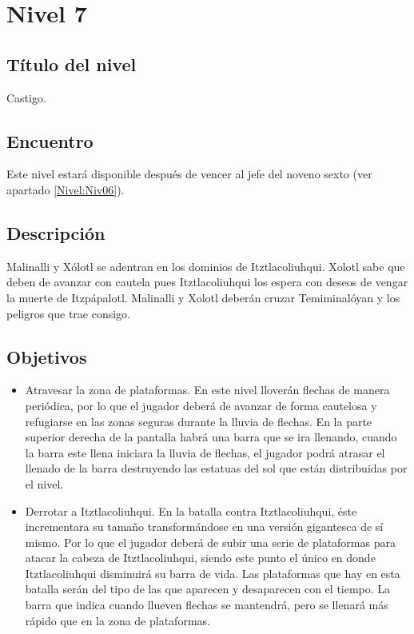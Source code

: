 \section{Nivel 7}  \label{Nivel:Niv07}
	\subsection{Título del nivel}
	Castigo.
	\subsection{Encuentro}
	Este nivel estará disponible después de vencer al jefe del noveno sexto (ver apartado \ref{Nivel:Niv06}).
	\subsection{Descripción}
	Malinalli y Xólotl se adentran en los dominios de Itztlacoliuhqui. Xolotl sabe que deben de avanzar con cautela pues Itztlacoliuhqui los espera con deseos de vengar la muerte de Itzpápalotl. Malinalli y Xolotl deberán cruzar Temiminalóyan y los peligros que trae consigo.
	\subsection{Objetivos}
	\begin{itemize}
		\item Atravesar la zona de plataformas. En este nivel lloverán flechas de manera periódica, por lo que el jugador deberá de avanzar de forma cautelosa y refugiarse en las zonas seguras durante la lluvia de flechas. En la parte superior derecha de la pantalla habrá una barra que se ira llenando, cuando la barra este llena iniciara la lluvia de flechas, el jugador podrá atrasar el llenado de la barra destruyendo las estatuas del sol que están distribuidas por el nivel.  
		\item Derrotar a Itztlacoliuhqui. En la batalla contra Itztlacoliuhqui, éste incrementara su tamaño transformándose en una versión gigantesca de sí mismo.  Por lo que el jugador deberá de subir una serie de plataformas para atacar la cabeza de Itztlacoliuhqui, siendo este punto el único en donde Itztlacoliuhqui disminuirá su barra de vida. Las plataformas que hay en esta batalla serán del tipo de las que aparecen y desaparecen con el tiempo. La barra que indica cuando llueven flechas se mantendrá, pero se llenará más rápido que en la zona de plataformas.
	\end{itemize}
